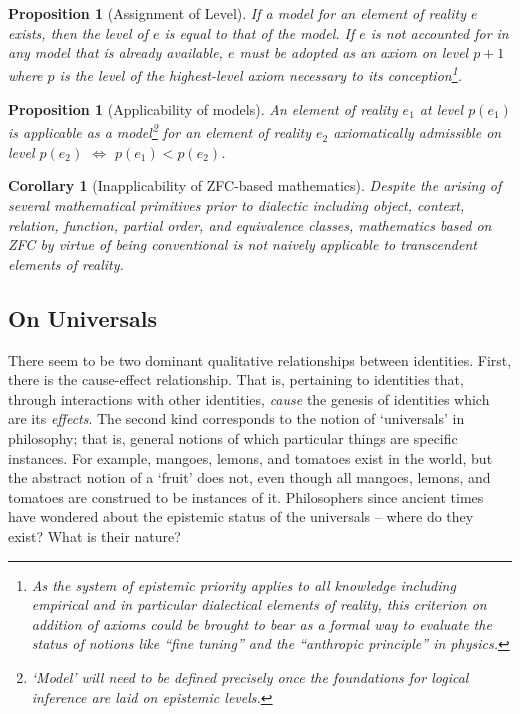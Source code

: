 \documentclass[pra,twocolumn,groupedaddress,10pt]{revtex4}
\newtheorem{proposition}[theorem]{Proposition}
\newtheorem{corollary}[theorem]{Corollary}
\theoremstyle{definition}
\begin{document}
\begin{proposition}[Assignment of Level]
	If a model for an element of reality $e$ exists, then the level of $e$ is equal to that of the model. If $e$ is not accounted for in any model that is already available, $e$ must be adopted as an axiom on level $p + 1$ where $p$ is the level of the highest-level axiom necessary to its conception\footnote{As the system of epistemic priority applies to all knowledge including empirical and in particular dialectical elements of reality, this criterion on addition of axioms could be brought to bear as a formal way to evaluate the status of notions like ``fine tuning'' and the ``anthropic principle'' in physics.}.
\end{proposition}

\begin{proposition}[Applicability of models]
	An element of reality $e_{1}$ at level $p(e_{1})$ is applicable as a model\footnote{`Model' will need to be defined precisely once the foundations for logical inference are laid on epistemic levels.} for an element of reality $e_{2}$ axiomatically admissible on level $p(e_{2})$ $\iff$ $p(e_{1}) < p(e_{2})$.
\end{proposition}

\begin{corollary}[Inapplicability of ZFC-based mathematics]
	Despite the arising of several mathematical primitives prior to dialectic including object, context, relation, function, partial order, and equivalence classes, mathematics based on ZFC by virtue of being conventional is not naively applicable to transcendent elements of reality.
\end{corollary}

\subsection{On Universals} \label{sec:onuni}

There seem to be two dominant qualitative relationships between identities. First, there is the cause-effect relationship. That is, pertaining to identities that, through interactions with other identities, \emph{cause} the genesis of identities which are its \emph{effects}. The second kind corresponds to the notion of `universals' in philosophy; that is, general notions of which particular things are specific instances. For example, mangoes, lemons, and tomatoes exist in the world, but the abstract notion of a `fruit' does not, even though all mangoes, lemons, and tomatoes are construed to be instances of it. Philosophers since ancient times have wondered about the epistemic status of the universals -- where do they exist? What is their nature?
\end{document}
